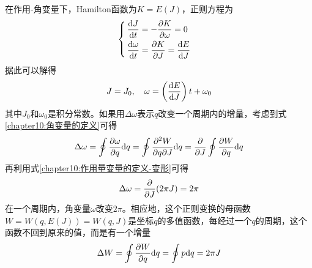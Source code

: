 在作用-角变量下，Hamilton函数为$K=E(J)$，正则方程为
\begin{equation}
\begin{cases}
	\dfrac{\mathrm{d} J}{\mathrm{d} t} = -\dfrac{\partial K}{\partial \omega} = 0 \\[1.5ex]
	\dfrac{\mathrm{d} \omega}{\mathrm{d} t} = \dfrac{\partial K}{\partial J} = \dfrac{\mathrm{d} E}{\mathrm{d} J}
\end{cases}
\end{equation}
据此可以解得
\begin{equation}
	J = J_0,\quad \omega = \left(\dfrac{\mathrm{d} E}{\mathrm{d} J}\right) t + \omega_0
\end{equation}
其中$J_0$和$\omega_0$是积分常数。如果用$\Delta\omega$表示$q$改变一个周期内的增量，考虑到式\eqref{chapter10:角变量的定义}可得
\begin{equation}
	\Delta \omega = \oint \frac{\partial \omega}{\partial q}\mathrm{d} q = \oint \frac{\partial^2 W}{\partial q\partial J}\mathrm{d} q = \frac{\partial}{\partial J} \oint \frac{\partial W}{\partial q} \mathrm{d} q
\end{equation}
再利用式\eqref{chapter10:作用量变量的定义-变形}可得
\begin{equation}
	\Delta \omega = \frac{\partial}{\partial J} (2\pi J) = 2\pi
\end{equation}
在一个周期内，角变量$\omega$改变$2\pi$。相应地，这个正则变换的母函数$W=W(q,E(J))=W(q,J)$是坐标$q$的多值函数，每经过一个$q$的周期，这个函数不回到原来的值，而是有一个增量
\begin{equation}
	\Delta W = \oint \frac{\partial W}{\partial q}\mathrm{d} q = \oint p\mathrm{d} q = 2\pi J
\end{equation}

